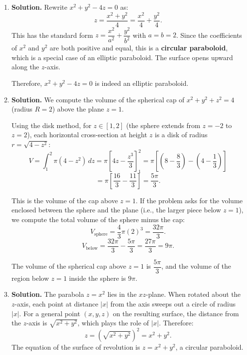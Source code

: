 \begin{enumerate}
\item \textbf{Solution.}
Rewrite \( x^2 + y^2 - 4z = 0 \) as:
\[
z = \frac{x^2 + y^2}{4} = \frac{x^2}{4} + \frac{y^2}{4}.
\]
This has the standard form \( z = \dfrac{x^2}{a^2} + \dfrac{y^2}{b^2} \) with \( a = b = 2 \). Since the coefficients of \( x^2 \) and \( y^2 \) are both positive and equal, this is a \textbf{circular paraboloid}, which is a special case of an elliptic paraboloid. The surface opens upward along the \( z \)-axis.

Therefore, \( x^2 + y^2 - 4z = 0 \) is indeed an elliptic paraboloid.

\item \textbf{Solution.}
We compute the volume of the spherical cap of \( x^2 + y^2 + z^2 = 4 \) (radius \( R = 2 \)) above the plane \( z = 1 \).

Using the disk method, for \( z \in [1, 2] \) (the sphere extends from \( z = -2 \) to \( z = 2 \)), each horizontal cross-section at height \( z \) is a disk of radius \( r = \sqrt{4 - z^2} \):
\[
V = \int_{1}^{2} \pi(4 - z^2)\, dz = \pi \left[ 4z - \frac{z^3}{3} \right]_1^2 = \pi \left[\left(8 - \frac{8}{3}\right) - \left(4 - \frac{1}{3}\right)\right]
\]
\[
= \pi \left[\frac{16}{3} - \frac{11}{3}\right] = \frac{5\pi}{3}.
\]

This is the volume of the cap above \( z = 1 \). If the problem asks for the volume enclosed between the sphere and the plane (i.e., the larger piece below \( z = 1 \)), we compute the total volume of the sphere minus the cap:
\[
V_{\text{sphere}} = \frac{4}{3}\pi (2)^3 = \frac{32\pi}{3}.
\]
\[
V_{\text{below}} = \frac{32\pi}{3} - \frac{5\pi}{3} = \frac{27\pi}{3} = 9\pi.
\]

The volume of the spherical cap above \( z = 1 \) is \( \dfrac{5\pi}{3} \), and the volume of the region below \( z = 1 \) inside the sphere is \( 9\pi \).

\item \textbf{Solution.}
The parabola \( z = x^2 \) lies in the \( xz \)-plane. When rotated about the \( z \)-axis, each point at distance \( |x| \) from the axis sweeps out a circle of radius \( |x| \). For a general point \( (x, y, z) \) on the resulting surface, the distance from the \( z \)-axis is \( \sqrt{x^2 + y^2} \), which plays the role of \( |x| \). Therefore:
\[
z = (\sqrt{x^2 + y^2})^2 = x^2 + y^2.
\]
The equation of the surface of revolution is \( z = x^2 + y^2 \), a circular paraboloid.

\end{enumerate}
